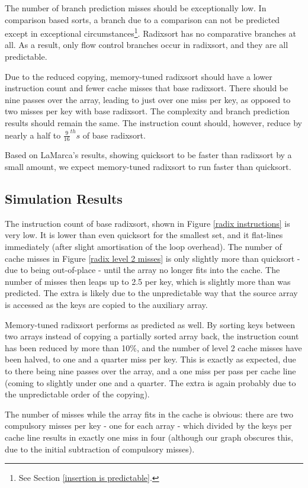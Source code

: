 The number of branch prediction misses should be exceptionally low. In
comparison based sorts, a branch due to a comparison can not be predicted except
in exceptional circumstances\footnote{See Section \ref{insertion is
predictable}.}. Radixsort has no comparative branches at all. As a result, only
flow control branches occur in radixsort, and they are all predictable.

Due to the reduced copying, memory-tuned radixsort should have a lower
instruction count and fewer cache misses that base radixsort. There should be
nine passes over the array, leading to just over one miss per key, as opposed to
two misses per key with base radixsort. The complexity and branch prediction
results should remain the same. The instruction count should, however, reduce by
nearly a half to $\frac{9}{16}^{th}s$ of base radixsort.

Based on LaMarca's results, showing quicksort to be faster than radixsort by a
small amount, we expect memory-tuned radixsort to run faster than quicksort.

\subsection{Simulation Results}

The instruction count of base radixsort, shown in Figure \ref{radix
instructions} is very low. It is lower than even quicksort for the smallest set,
and it flat-lines immediately (after slight amortisation of the loop overhead).
The number of cache misses in Figure \ref{radix level 2 misses} is only slightly
more than quicksort - due to being out-of-place - until the array no longer fits
into the cache. The number of misses then leaps up to 2.5 per key, which is
slightly more than was predicted. The extra is likely due to the unpredictable
way that the source array is accessed as the keys are copied to the auxiliary
array.

Memory-tuned radixsort performs as predicted as well. By sorting keys between two
arrays instead of copying a partially sorted array back, the instruction count
has been reduced by more than 10\%, and the number of level 2 cache misses
have been halved, to one and a quarter miss per key. This is exactly
as expected, due to there being nine passes over the array, and a one miss
per pass per cache line (coming to slightly under one and a quarter. The extra
is again probably due to the unpredictable order of the copying).

The number of misses while the array fits in the cache is obvious: there
are two compulsory misses per key - one for each array - which divided by the
keys per cache line results in exactly one miss in four (although our graph
obscures this, due to the initial subtraction of compulsory misses).


